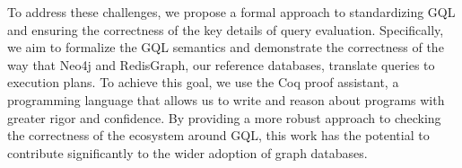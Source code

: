 \documentclass[14pt]{constructor-thesis}
\theoremstyle{definition}
\begin{document}


To address these challenges, we propose a formal approach to standardizing GQL and ensuring the correctness of the key details of query evaluation. Specifically, we aim to formalize the GQL semantics and demonstrate the correctness of the way that Neo4j and RedisGraph, our reference databases, translate queries to execution plans. To achieve this goal, we use the Coq proof assistant, a programming language that allows us to write and reason about programs with greater rigor and confidence. By providing a more robust approach to checking the correctness of the ecosystem around GQL, this work has the potential to contribute significantly to the wider adoption of graph databases.



\end{document}
